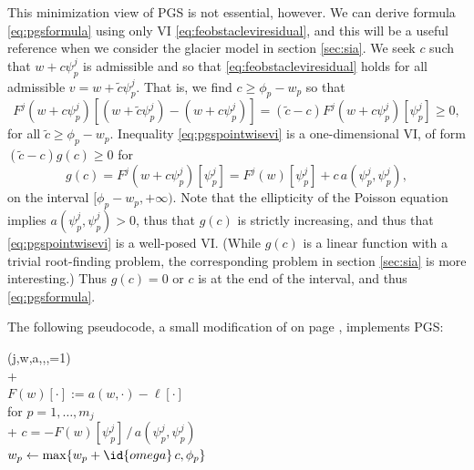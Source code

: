 \documentclass[letterpaper,final,12pt,reqno]{amsart}
\theoremstyle{claim}
\numberwithin{equation}{section}
\numberwithin{figure}{section}
\numberwithin{table}{section}
\numberwithin{theorem}{section}
\begin{document}
This minimization view of PGS is not essential, however.  We can derive formula \eqref{eq:pgsformula} using only VI \eqref{eq:feobstacleviresidual}, and this will be a useful reference when we consider the glacier model in section \ref{sec:sia}.  We seek $c$ such that $w+c\psi_p^j$ is admissible and so that \eqref{eq:feobstacleviresidual} holds for all admissible $v=w+\tilde c\psi_p^j$.  That is, we find $c\ge \phi_p-w_p$ so that
\begin{equation}
  F^j(w+c\psi_p^j)[(w+\tilde c\psi_p^j) - (w+c\psi_p^j)] = (\tilde c - c) F^j(w+c\psi_p^j)[\psi_p^j] \ge 0,  \label{eq:pgspointwisevi}
\end{equation}
for all $\tilde c\ge \phi_p-w_p$.  Inequality \eqref{eq:pgspointwisevi} is a one-dimensional VI, of form $(\tilde c - c)g(c) \ge 0$ for
\begin{equation}
  g(c) = F^j(w+c\psi_p^j)[\psi_p^j] = F^j(w)[\psi_p^j] + c\,a(\psi_p^j,\psi_p^j),  \label{eq:pgspointwisegfunction}
\end{equation}
on the interval $[\phi_p-w_p,+\infty)$.  Note that the ellipticity of the Poisson equation implies $a(\psi_p^j,\psi_p^j)>0$, thus that $g(c)$ is strictly increasing, and thus that \eqref{eq:pgspointwisevi} is a well-posed VI.  (While $g(c)$ is a linear function with a trivial root-finding problem, the corresponding problem in section \ref{sec:sia} is more interesting.)  Thus $g(c)=0$ or $c$ is at the end of the interval, and thus \eqref{eq:pgsformula}.

The following pseudocode, a small modification of  on page \pageref{ps:gs-sweep}, implements PGS:
\begin{pseudo*} \label{ps:pgs}
(j,w,a,\ell,\phi,=1)\text{:} \\+
     \\
    $F(w)[\cdot] := a(w,\cdot) - \ell[\cdot]$ \\
    for $p=1,\dots,m_j$ \\+
        $c = -F(w)[\psi_p^j] \,\big/\, a(\psi_p^j,\psi_p^j)$ \\
        $w_p \gets \max\{w_p + \id{omega}\,c, \phi_p\}$
\end{pseudo*}
\end{document}
